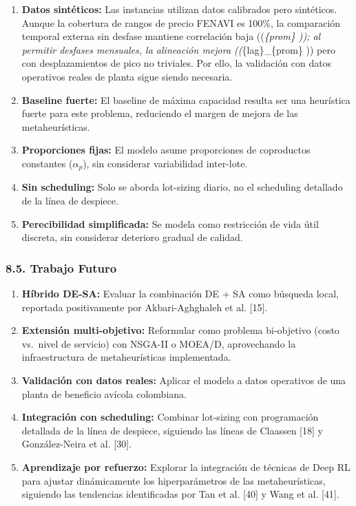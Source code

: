 \documentclass[
  spanish,
  12pt,
]{article}
\providecommand{\tightlist}{%
  \setlength{\itemsep}{0pt}\setlength{\parskip}{0pt}}
\begin{document}
\begin{enumerate}
\def\labelenumi{\arabic{enumi}.}
\tightlist
\item
  \textbf{Datos sintéticos:} Las instancias utilizan datos calibrados
  pero sintéticos. Aunque la cobertura de rangos de precio FENAVI es
  100\%, la comparación temporal externa sin desfase mantiene
  correlación baja ((\textbar{}\rho\textbar{}\emph{\{prom\}
  )); al permitir desfases mensuales, la alineación mejora
  ((\textbar{}\rho}\{lag\}\textbar\_\{prom\} )) pero con
  desplazamientos de pico no triviales. Por ello, la validación con
  datos operativos reales de planta sigue siendo necesaria.
\item
  \textbf{Baseline fuerte:} El baseline de máxima capacidad resulta ser
  una heurística fuerte para este problema, reduciendo el margen de
  mejora de las metaheurísticas.
\item
  \textbf{Proporciones fijas:} El modelo asume proporciones de
  coproductos constantes (\(\alpha_p\)), sin considerar variabilidad
  inter-lote.
\item
  \textbf{Sin scheduling:} Solo se aborda lot-sizing diario, no el
  scheduling detallado de la línea de despiece.
\item
  \textbf{Perecibilidad simplificada:} Se modela como restricción de
  vida útil discreta, sin considerar deterioro gradual de calidad.
\end{enumerate}

\subsubsection{8.5. Trabajo Futuro}\label{trabajo-futuro}

\begin{enumerate}
\def\labelenumi{\arabic{enumi}.}
\tightlist
\item
  \textbf{Híbrido DE-SA:} Evaluar la combinación DE + SA como búsqueda
  local, reportada positivamente por Akbari-Aghghaleh et al. {[}15{]}.
\item
  \textbf{Extensión multi-objetivo:} Reformular como problema
  bi-objetivo (costo vs.~nivel de servicio) con NSGA-II o MOEA/D,
  aprovechando la infraestructura de metaheurísticas implementada.
\item
  \textbf{Validación con datos reales:} Aplicar el modelo a datos
  operativos de una planta de beneficio avícola colombiana.
\item
  \textbf{Integración con scheduling:} Combinar lot-sizing con
  programación detallada de la línea de despiece, siguiendo las líneas
  de Claassen {[}18{]} y González-Neira et al. {[}30{]}.
\item
  \textbf{Aprendizaje por refuerzo:} Explorar la integración de técnicas
  de Deep RL para ajustar dinámicamente los hiperparámetros de las
  metaheurísticas, siguiendo las tendencias identificadas por Tan et al.
  {[}40{]} y Wang et al. {[}41{]}.
\end{enumerate}
\end{document}
